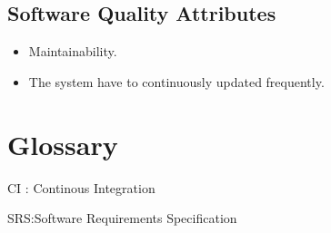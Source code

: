 \documentclass[12pt,a4paper,oneside]{report}
\begin{document}
\section {Software Quality Attributes	}
\begin{itemize}
\item	Maintainability.
\item The system have to continuously updated frequently.
\end{itemize}



\vspace{.4 in }

\newpage

\chapter{Glossary}



\vspace{.1 in }
\begin{flushleft}
CI \hspace{1.6 in}:\hspace{.1 in} Continous Integration\\ 
\end{flushleft}

\begin{flushleft}
SRS\hspace{1.6 in}:\hspace{.1 in}Software Requirements Specification\\
\end{flushleft}

 

 \vspace{.1 in }
\hspace{.3 in} 
\end{document}
